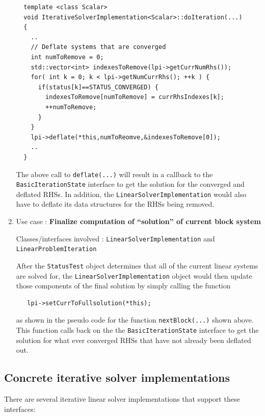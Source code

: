 \documentclass[pdf,ps2pdf,11pt]{SANDreport}
\begin{document}
\begin{enumerate}
{\scriptsize\begin{verbatim}
  template <class Scalar>
  void IterativeSolverImplementation<Scalar>::doIteration(...)
  {
    ..
    // Deflate systems that are converged
    int numToRemove = 0;
    std::vector<int> indexesToRemove(lpi->getCurrNumRhs());
    for( int k = 0; k < lpi->getNumCurrRhs(); ++k ) {
      if(status[k]==STATUS_CONVERGED) {
        indexesToRemove[numToRemove] = currRhsIndexes[k];
        ++numToRemove;
      }
    } 
    lpi->deflate(*this,numToReomve,&indexesToRemove[0]);
    ..
  }
\end{verbatim}}

The above call to {}\texttt{deflate(...)} will result in a callback to
the {}\texttt{Basic\-Iteration\-State} interface to get the solution
for the converged and deflated RHSs.  In addition, the
{}\texttt{Linear\-Solver\-Implementation} would also have to deflate
its data structures for the RHSs being removed.

{}\item Use case : \textbf{Finalize computation of ``solution'' of
current block system}

{}\noindent{}Classes/interfaces involved :
{}\texttt{Linear\-Solver\-Implementation} and
{}\texttt{Linear\-Problem\-Iteration}

After the {}\texttt{Status\-Test} object determines that all of the
current linear systems are solved for, the
{}\texttt{Linear\-Solver\-Implementation} object would then update
those components of the final solution by simply calling the function

{\scriptsize\begin{verbatim}
   lpi->setCurrToFullsolution(*this);
\end{verbatim}}

{}\noindent{}as shown in the pseudo code for the function
{}\texttt{nextBlock(...)} shown above.  This function calls back on
the the {}\texttt{Basic\-Iteration\-State} interface to get the
solution for what ever converged RHSs that have not already been
deflated out.

\end{enumerate}

\subsection{Concrete iterative solver implementations}

There are several iterative linear solver implementations that support
these interfaces:
\end{document}
